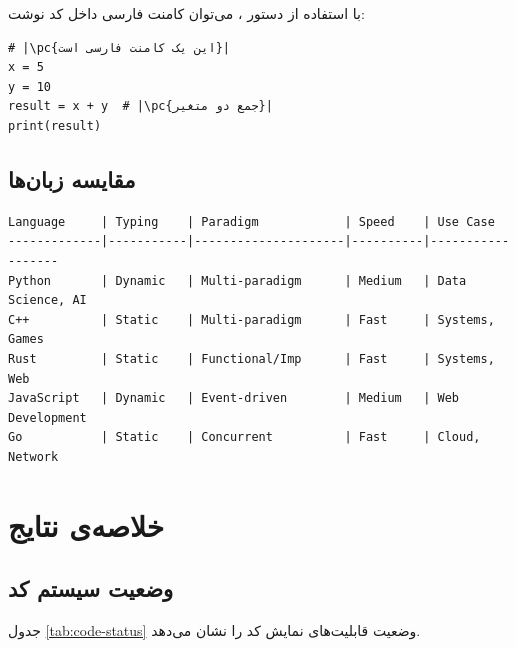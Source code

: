 \documentclass{matinbook}
\begin{document}
با استفاده از دستور ، می‌توان
کامنت فارسی داخل کد نوشت:

\begin{latin}
\begin{verbatim}
# |\pc{این یک کامنت فارسی است}|
x = 5
y = 10
result = x + y  # |\pc{جمع دو متغیر}|
print(result)
\end{verbatim}
\end{latin}
\label{code:persian-comments}

\section{مقایسه زبان‌ها}
\label{sec:code-comparison}

\begin{latin}
\begin{verbatim}
Language     | Typing    | Paradigm            | Speed    | Use Case
-------------|-----------|---------------------|----------|------------------
Python       | Dynamic   | Multi-paradigm      | Medium   | Data Science, AI
C++          | Static    | Multi-paradigm      | Fast     | Systems, Games
Rust         | Static    | Functional/Imp      | Fast     | Systems, Web
JavaScript   | Dynamic   | Event-driven        | Medium   | Web Development
Go           | Static    | Concurrent          | Fast     | Cloud, Network
\end{verbatim}
\end{latin}
\label{code:comparison}

\chapter{خلاصه‌ی نتایج}
\label{chap:summary}

\section{وضعیت سیستم کد}
\label{sec:summary-code-status}

جدول \cref{tab:code-status} وضعیت قابلیت‌های نمایش کد
 را نشان می‌دهد.
\end{document}
